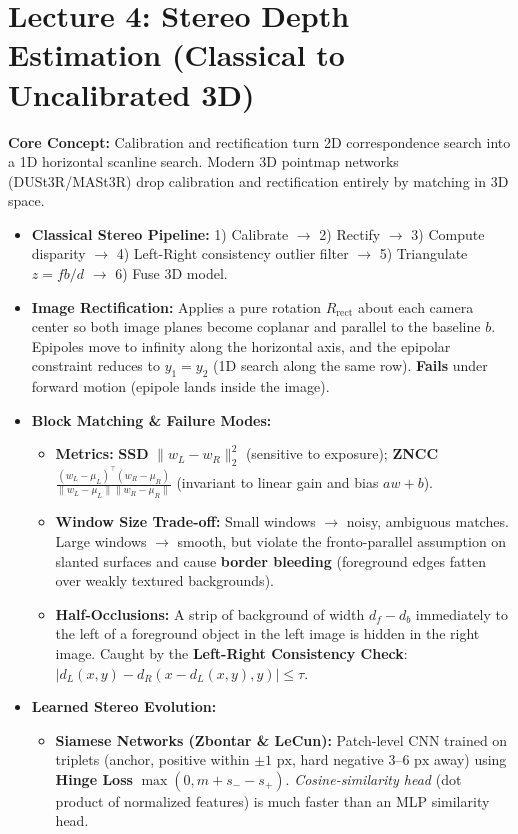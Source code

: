 \documentclass[11pt,a4paper]{article}
\theoremstyle{definition}
\theoremstyle{plain}
\theoremstyle{remark}
\begin{document}
\hr
\section*{\textcolor{primary}{Lecture 4: Stereo Depth Estimation (Classical to Uncalibrated 3D)}}
\textbf{Core Concept:} Calibration and rectification turn 2D correspondence search into a 1D horizontal scanline search. Modern 3D pointmap networks (DUSt3R/MASt3R) drop calibration and rectification entirely by matching in 3D space.

\begin{itemize}
    \item \textbf{Classical Stereo Pipeline:} 1) Calibrate $\rightarrow$ 2) Rectify $\rightarrow$ 3) Compute disparity $\rightarrow$ 4) Left-Right consistency outlier filter $\rightarrow$ 5) Triangulate $z = fb/d$ $\rightarrow$ 6) Fuse 3D model.
    \item \textbf{Image Rectification:} Applies a pure rotation $R_{\text{rect}}$ about each camera center so both image planes become coplanar and parallel to the baseline $b$. Epipoles move to infinity along the horizontal axis, and the epipolar constraint reduces to $y_1 = y_2$ (1D search along the same row). \textbf{Fails} under forward motion (epipole lands inside the image).
    \item \textbf{Block Matching \& Failure Modes:}
    \begin{itemize}
        \item \textbf{Metrics:} \textbf{SSD} $\|w_L - w_R\|_2^2$ (sensitive to exposure); \textbf{ZNCC} $\frac{(w_L-\mu_L)^\top(w_R-\mu_R)}{\|w_L-\mu_L\|\|w_R-\mu_R\|}$ (invariant to linear gain and bias $a w + b$).
        \item \textbf{Window Size Trade-off:} Small windows $\rightarrow$ noisy, ambiguous matches. Large windows $\rightarrow$ smooth, but violate the fronto-parallel assumption on slanted surfaces and cause \textbf{border bleeding} (foreground edges fatten over weakly textured backgrounds).
        \item \textbf{Half-Occlusions:} A strip of background of width $d_f - d_b$ immediately to the left of a foreground object in the left image is hidden in the right image. Caught by the \textbf{Left-Right Consistency Check}: $|d_L(x,y) - d_R(x - d_L(x,y), y)| \le \tau$.
    \end{itemize}
    \item \textbf{Learned Stereo Evolution:}
    \begin{itemize}
        \item \textbf{Siamese Networks (Zbontar \& LeCun):} Patch-level CNN trained on triplets (anchor, positive within $\pm 1\text{ px}$, hard negative $3\text{--}6\text{ px}$ away) using \textbf{Hinge Loss} $\max(0, m + s_- - s_+)$. \emph{Cosine-similarity head} (dot product of normalized features) is much faster than an MLP similarity head.

\end{itemize}
\end{itemize}
\end{document}
